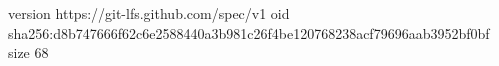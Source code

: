 version https://git-lfs.github.com/spec/v1
oid sha256:d8b747666f62c6e2588440a3b981c26f4be120768238acf79696aab3952bf0bf
size 68
